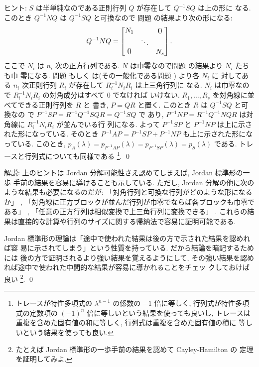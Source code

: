 \documentclass[12pt,twoside]{jarticle}
\begin{document}
\noindent
ヒント: $S$ は半単純なのである正則行列 $Q$ が存在して $Q^{-1}SQ$ は上の形に
なる.  このとき $Q^{-1}NQ$ は $Q^{-1}SQ$ と可換なので
問題  の結果より次の形になる:
\begin{equation*}
  Q^{-1}NQ = 
  \begin{bmatrix}
    N_1       &        & \bigzerou \\
              & \ddots & \\
    \bigzerol &        & N_s \\
  \end{bmatrix}.
\end{equation*}
ここで $N_i$ は $n_i$ 次の正方行列である.  
$N$ は巾零なので問題  の結果より $N_i$ たちも巾
零になる.  問題  もしく
は(その一般化である問題 ) より各 $N_i$ に
対してある $n_i$ 次正則行列 $R_i$ が存在して $R_i^{-1}N_iR_i$ は上三角行列に
なる.  $N_i$ は巾零なので $R_i^{-1}N_iR_i$ の対角成分はすべて $0$ でなければ
いけない.  $R_1,\dots,R_s$ を対角線に並べてできる正則行列を $R$ と
書き, $P=QR$ と置く.
このとき $R$ は $Q^{-1}SQ$ と可換なの
で $P^{-1}SP=R^{-1}Q^{-1}SQR = Q^{-1}SQ$ で
あり, $P^{-1}NP=R^{-1}Q^{-1}NQR$ は対角線に $R_i^{-1}N_iR_i$ が並んでいる行
列になる.  よって $P^{-1}SP$ と $P^{-1}NP$ は上に示された形になっている.
そのとき $P^{-1}AP=P^{-1}SP+P^{-1}NP$ も上に示された形になっている.
このとき, $p_A(\lambda)=p_{P^{-1}AP}(\lambda)=p_{P^{-1}SP}(\lambda)
=p_S(\lambda)$ である.  トレースと行列式についても同様である%
\footnote{トレースが特性多項式の $\lambda^{n-1}$ の係数の $-1$ 倍に等しく,
  行列式が特性多項式の定数項の $(-1)^n$ 倍に等しいという結果を使っても良いし,
  トレースは重複を含めた固有値の和に等しく, 行列式は重複を含めた固有値の積に
  等しいという結果を使っても良い.}.
\qed

\medskip
\noindent
解説: 上のヒントは Jordan 分解可能性さえ認めてしまえば, Jordan 標準形の一歩
手前の結果を容易に導けることも示している.  
ただし, Jordan 分解の他に次のような結果も必要になるのだが:
「対角行列と可換な行列がどのような形になるか」
,
「対角線に正方ブロックが並んだ行列が巾零でならば各ブロックも巾零である」
,
「任意の正方行列は相似変換で上三角行列に変換できる」
.
これらの結果は直接的な計算や行列のサイズに関する帰納法で容易に証明可能である.

Jordan 標準形の理論は「途中で使われた結果は後の方で示された結果を認めれば容
易に示されてしまう」という性質を持っている.  だから結論を暗記するためには
後の方で証明されるより強い結果を覚えるようにして, 
その強い結果を認めれば途中で使われた中間的な結果が容易に導かれることをチェッ
クしておけば良い%
\footnote{たとえば Jordan 標準形の一歩手前の結果を認めて Cayley-Hamilton の
  定理を証明してみよ.}.
\qed
\end{document}
